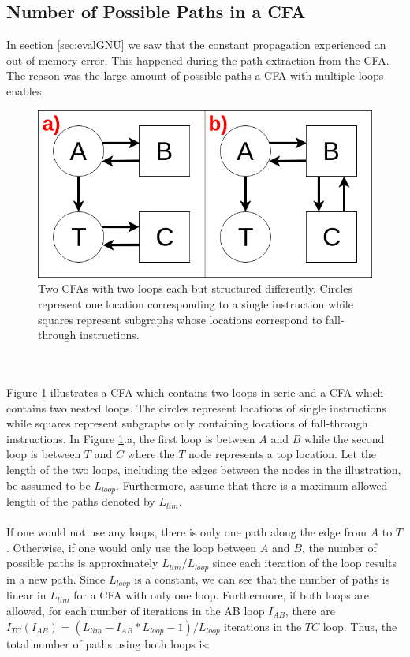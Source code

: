 \documentclass{kththesis}
\begin{document}
\subsection{Number of Possible Paths in a CFA}\label{sec:numPaths}
In section \ref{sec:evalGNU} we saw that the constant propagation experienced an out of memory error. This happened during the path extraction from the CFA. The reason was the large amount of possible paths a CFA with multiple loops enables.
\begin{figure}[th]
    \centering
    \includegraphics[scale=0.3]{Images/nestedCFA.png}
    \caption[Two CFAs with two loops each but structured differently.]{Two CFAs with two loops each but structured differently. Circles represent one location corresponding to a single instruction while squares represent subgraphs whose locations correspond to fall-through instructions.}
    \label{fig:pathExpNested}
\end{figure}
\\ \\
Figure \ref{fig:pathExpNested} illustrates a CFA which contains two loops in serie and a CFA which contains two nested loops. The circles represent locations of single instructions while squares represent subgraphs only containing locations of fall-through instructions. In Figure \ref{fig:pathExpNested}.a, the first loop is between $A$ and $B$ while the second loop is between $T$ and $C$ where the $T$ node represents a top location. Let the length of the two loops, including the edges between the nodes in the illustration, be assumed to be $L_{loop}$. Furthermore, assume that there is a maximum allowed length of the paths denoted by $L_{lim}$.
\\ \\ 
If one would not use any loops, there is only one path along the edge from $A$ to $T$. Otherwise, if one would only use the loop between $A$ and $B$, the number of possible paths is approximately $L_{lim}/L_{loop}$ since each iteration of the loop results in a new path. Since $L_{loop}$ is a constant, we can see that the number of paths is linear in $L_{lim}$ for a CFA with only one loop. Furthermore, if both loops are allowed, for each number of iterations in the AB loop $I_{AB}$, there are $I_{TC}(I_{AB}) = (L_{lim}-I_{AB}*L_{loop}-1)/L_{loop}$ iterations in the $TC$ loop. Thus, the total number of paths using both loops is:
\end{document}

